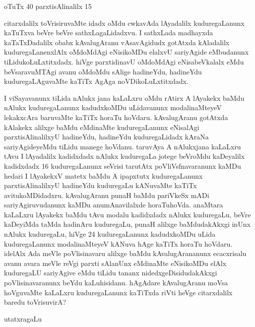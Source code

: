 \begin{enumerate}[\rm 1)]
\hspace{0.5cm}
oTuTx {\rm 40} parxtisAlinalilx {\rm 15} 

citarxdalilx toVrisiruvaMte idadx oMdu cwkavAda lAyadalilx kuduregaLanunx kaTuTxva beVre beVre sathxLagaLidadxvu. I sathxLada madhayxda kaTaTxDadalilx obabx kAvalugAranu vAsavAgidudx gotAtxda kAladalilx kuduregaLanenxlAlx oMdoMdAgi eNisikoMDu elalxvU sariyAgide eMbudanunx tiLidukoLuLxtitxdadx. hiVge parxtidinavU oMdoMdAgi eNisabeVkalalx eMdu beVsaravuMTAgi avanu oMdoMdu sAlige hadineYdu, hadineYdu kuduregaLAguvaMte kaTiTx AgAga noVDikoLuLxtitxdadx.

I viSayavanunx tiLida nAlukx jana kaLaLxru oMdu rAtirx A lAyakekx baMdu nAlukx kuduregaLanunx kadudxkoMDu uLidavanunx modalinaMteyeV lekakxcAra baruvaMte kaTiTx horaTu hoVdaru. kAvalugAranu gotAtxda kAlakekx alilxge baMdu eMdinaMte kuduregaLanunx eNisalAgi parxtisAlinalilxyU hadineYdu, hadineYdu kuduregaLidadx kAraNa sariyAgideyeMdu tiLidu manege hoVdanu. taruvAya A nAlukxjana kaLaLxru tAvu I lAyadalilx kadidxdadx nAlukx kuduregaLa jotege beVroMdu kaDeyalilx kadidxdadx {\rm 16} kuduregaLanunx seVrisi tarutAtx poVliVsfnavaranunx kaMDu hedari I lAyakekxV matetx baMdu A ipapxtutx kuduregaLanunx parxtisAlinalilxyU hadineYdu kuduregaLu kANuvaMte kaTiTx avitukoMDidadxru. kAvalugAranu punaH baMdu pariVkeSx mADi sariyAgiruvudanunx kaMDu anumAnavilalxde horaTuhoVda. anaMtara kaLaLxru lAyakekx baMdu tAvu modalu kadidxdadx nAlukx kuduregaLu, beVre kaDeyiMda taMda hadinAru kuduregaLu, punaH alilxge baMdudakAkxgi inUnx nAlukx kuduregaLu, hiVge {\rm 24} kuduregaLanunx kadudxkoMDu uLida kuduregaLanunx modalinaMteyeV kANuva hAge kaTiTx horaTu hoVdaru. idelAlx Ada meVle poVlisinavaru alilxge baMdu kAvalugArananunx ecacxrisalu avanu avara meVle reVgi parxti sAlanUnx eMdinaMte eNisikoMDu elAlx kuduregaLU sariyAgive eMdu tiLidu tananx nidedxgeDisidudakAkxgi poVlisinavaranunx beYdu kaLuhisidanu. hAgAdare kAvalugAranu moVsa hoVguvaMte kaLaLxru kuduregaLanunx kaTiTxda riVti heVge citarxdalilx baredu toVrisuvirA?
\begin{center}
utatxragaLu


\end{center}
\end{enumerate}
